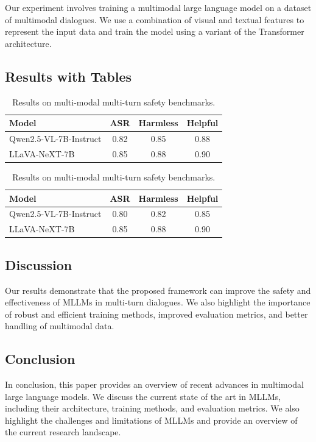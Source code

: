 \documentclass{article}
\begin{document}
Our experiment involves training a multimodal large language model on a dataset of multimodal dialogues. We use a combination of visual and textual features to represent the input data and train the model using a variant of the Transformer architecture.

\subsection{Results with Tables}

\begin{table}[!ht]
\centering
\begin{tabular}{l|c|c|c}
\toprule
Model & ASR & Harmless & Helpful \\
\midrule
Qwen2.5-VL-7B-Instruct & 0.82 & 0.85 & 0.88 \\
LLaVA-NeXT-7B & 0.85 & 0.88 & 0.90 \\
\bottomrule
\end{tabular}
\caption{Results on multi-modal multi-turn safety benchmarks.}
\label{tab:results}
\end{table}

\begin{table}[!ht]
\centering
\begin{tabular}{l|c|c|c}
\toprule
Model & ASR & Harmless & Helpful \\
\midrule
Qwen2.5-VL-7B-Instruct & 0.80 & 0.82 & 0.85 \\
LLaVA-NeXT-7B & 0.85 & 0.88 & 0.90 \\
\bottomrule
\end{tabular}
\caption{Results on multi-modal multi-turn safety benchmarks.}
\label{tab:results2}
\end{table}

\subsection{Discussion}

Our results demonstrate that the proposed framework can improve the safety and effectiveness of MLLMs in multi-turn dialogues. We also highlight the importance of robust and efficient training methods, improved evaluation metrics, and better handling of multimodal data.

\subsection{Conclusion}

In conclusion, this paper provides an overview of recent advances in multimodal large language models. We discuss the current state of the art in MLLMs, including their architecture, training methods, and evaluation metrics. We also highlight the challenges and limitations of MLLMs and provide an overview of the current research landscape.
\end{document}
